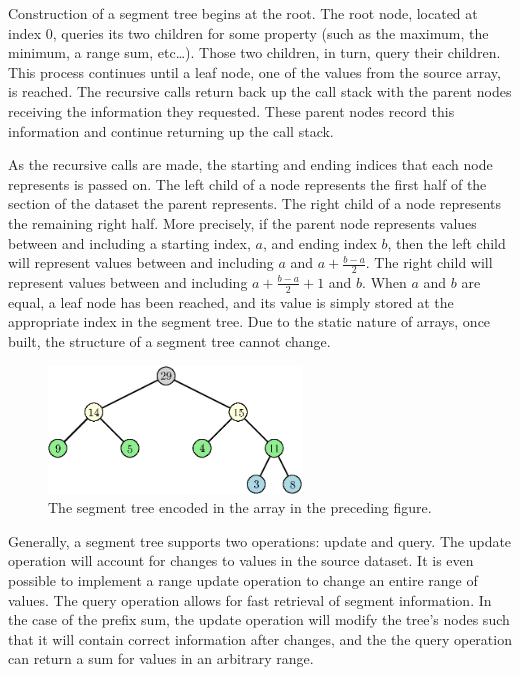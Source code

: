 Construction of a segment tree begins at the root.
The root node, located at index 0, queries its two children for some property (such as the maximum, the minimum, a range sum, etc\ldots).
Those two children, in turn, query their children.
This process continues until a leaf node, one of the values from the source array, is reached.
The recursive calls return back up the call stack with the parent nodes receiving the information they requested.
These parent nodes record this information and continue returning up the call stack.

As the recursive calls are made, the starting and ending indices that each node represents is passed on.
The left child of a node represents the first half of the section of the dataset the parent represents.
The right child of a node represents the remaining right half.
More precisely, if the parent node represents values between and including a starting index, $a$, and ending index $b$, then the left child will represent values between and including $a$ and $a + \frac{b - a}{2}$.
The right child will represent values between and including $a + \frac{b - a}{2} + 1$ and $b$.
When $a$ and $b$ are equal, a leaf node has been reached, and its value is simply stored at the appropriate index in the segment tree.
Due to the static nature of arrays, once built, the structure of a segment tree cannot change.

\begin{figure}[h]
    \centering
    \includegraphics[width=0.6\textwidth]{./structures/segment-tree/tree-visual}
    \caption{\small The segment tree encoded in the array in the preceding figure.}
\end{figure}







Generally, a segment tree supports two operations: update and query.
The update operation will account for changes to values in the source dataset.
It is even possible to implement a range update operation to change an entire range of values.
The query operation allows for fast retrieval of segment information.
In the case of the prefix sum, the update operation will modify the tree's nodes such that it will contain correct information after changes, and the the query operation can return a sum for values in an arbitrary range.

